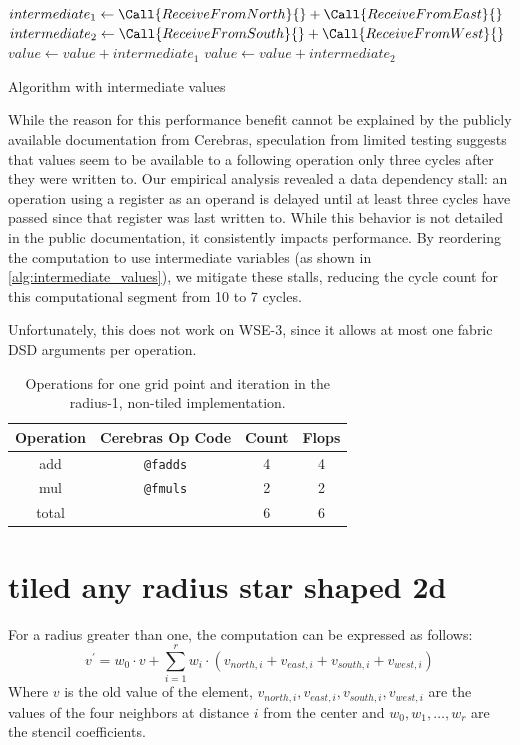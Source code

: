 \begin{algorithm}[tbh]
    \SetAlgoLined
    $intermediate_1 \gets \Call{ReceiveFromNorth}{} + \Call{ReceiveFromEast}{}$\;
    $intermediate_2 \gets \Call{ReceiveFromSouth}{} + \Call{ReceiveFromWest}{}$\;
    $value \gets value + intermediate_1$\;
    $value \gets value + intermediate_2$\;
    \caption{Algorithm with intermediate values}\label{alg:intermediate_values}
\end{algorithm}

While the reason for this performance benefit cannot be explained by the publicly available documentation from Cerebras, speculation from limited testing suggests that values seem to be available to a following operation only three cycles after they were written to.
Our empirical analysis revealed a data dependency stall: an operation using a register as an operand is delayed until at least three cycles have passed since that register was last written to. While this behavior is not detailed in the public documentation, it consistently impacts performance. By reordering the computation to use intermediate variables (as shown in \autoref{alg:intermediate_values}), we mitigate these stalls, reducing the cycle count for this computational segment from 10 to 7 cycles.

Unfortunately, this does not work on WSE-3, since it allows at most one fabric DSD arguments per operation.

\begin{table}[h]
    \centering
    \caption{Operations for one grid point and iteration in the radius-1, non-tiled implementation.}
    \label{tab:r1_non_tiled_operations}
    \begin{tabular}{@{}cccc@{}}
        \toprule
        Operation & Cerebras Op Code & Count & Flops \\
        \midrule
        add & \texttt{@fadds} & \num{4} & \num{4} \\
        mul & \texttt{@fmuls} & \num{2} & \num{2} \\
        \midrule
        total & & \num{6} & \num{6} \\
        \bottomrule
    \end{tabular}
\end{table}

\section{tiled any radius star shaped 2d}
For a radius greater than one, the computation can be expressed as follows:
\begin{equation}
    \label{eq:stencil_computation_tiled}
    v^{'} = w_0 \cdot v + \sum_{i=1}^{r} w_i \cdot (v_{north,i} + v_{east,i} + v_{south,i} + v_{west,i})
\end{equation}
Where $v$ is the old value of the element, $v_{north,i}, v_{east,i}, v_{south,i}, v_{west,i}$ are the values of the four neighbors at distance $i$ from the center and $w_0, w_1, \dots, w_r$ are the stencil coefficients.

